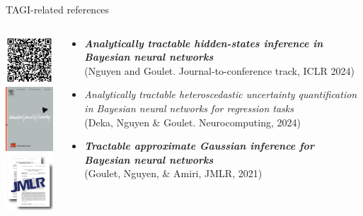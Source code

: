 \documentclass[final]{beamer}
\begin{document}
\begin{frame}[t]
\begin{columns}
\begin{column}[T]{.31\textwidth}
\begin{block}{TAGI-related references}
\begin{columns}
\begin{column}{.15\textwidth}\centering
\includegraphics[width=30mm]{Figures/cuTAGI_refs_QR.pdf}\\[5pt]
\includegraphics[width=20mm]{Figures/IJF.jpg}\\[5pt]
\includegraphics[width=22mm]{Figures/TAGI_AA_JMLR_2.png}
\end{column}\hspace{-20mm}


\begin{column}{.79\textwidth}
\begin{itemize}
\item \emph{\bf Analytically tractable hidden-states inference in Bayesian neural networks}\\ (Nguyen and Goulet. Journal-to-conference track, ICLR 2024)
\item \emph{Analytically tractable heteroscedastic uncertainty quantification in Bayesian neural networks for regression tasks}\\ (Deka, Nguyen \& Goulet. Neurocomputing, 2024)
\item \emph{\bf Tractable approximate Gaussian inference for Bayesian neural networks}\\ (Goulet, Nguyen, \& Amiri, JMLR, 2021)
\end{itemize}
\end{column}
\end{columns}
\end{block}





\end{column}
\end{columns}
\end{frame}
\end{document}
